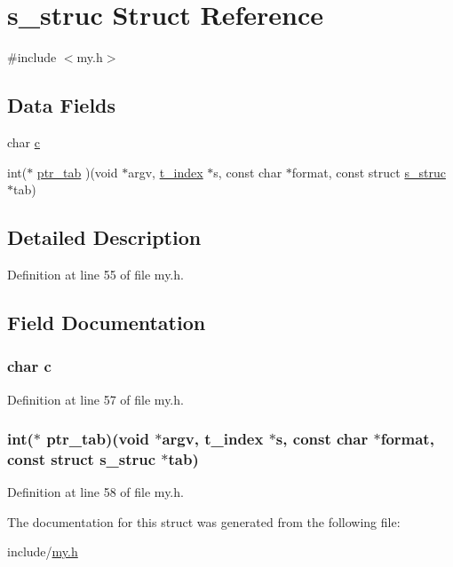 \hypertarget{structs__struc}{\section{s\+\_\+struc Struct Reference}
\label{structs__struc}
}


{\ttfamily \#include $<$my.\+h$>$}

\subsection*{Data Fields}
\begin{DoxyCompactItemize}
\item 
char \hyperlink{structs__struc_adc08ed1554f35803d229aeaf11216b3f}{c}
\item 
int($\ast$ \hyperlink{structs__struc_a69cf203dcd726a6fb62bd63ecab919f3}{ptr\+\_\+tab} )(void $\ast$argv, \hyperlink{my_8h_a648ad484eb5d7e8f5d781c45b20f874f}{t\+\_\+index} $\ast$s, const char $\ast$format, const struct \hyperlink{structs__struc}{s\+\_\+struc} $\ast$tab)
\end{DoxyCompactItemize}


\subsection{Detailed Description}


Definition at line 55 of file my.\+h.



\subsection{Field Documentation}
\hypertarget{structs__struc_adc08ed1554f35803d229aeaf11216b3f}{
\subsubsection[{c}]{\setlength{\rightskip}{0pt plus 5cm}char c}}\label{structs__struc_adc08ed1554f35803d229aeaf11216b3f}


Definition at line 57 of file my.\+h.

\hypertarget{structs__struc_a69cf203dcd726a6fb62bd63ecab919f3}{
\subsubsection[{ptr\+\_\+tab}]{\setlength{\rightskip}{0pt plus 5cm}int($\ast$ ptr\+\_\+tab)(void $\ast$argv, {\bf t\+\_\+index} $\ast$s, const char $\ast$format, const struct {\bf s\+\_\+struc} $\ast$tab)}}\label{structs__struc_a69cf203dcd726a6fb62bd63ecab919f3}


Definition at line 58 of file my.\+h.



The documentation for this struct was generated from the following file\+:\begin{DoxyCompactItemize}
\item 
include/\hyperlink{my_8h}{my.\+h}\end{DoxyCompactItemize}
